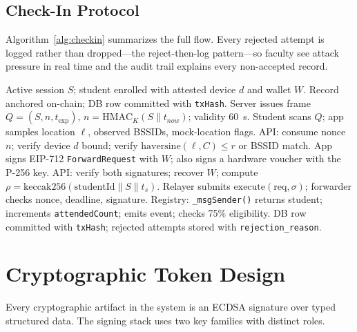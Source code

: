 \documentclass[conference]{IEEEtran}
\begin{document}
\subsection{Check-In Protocol}
Algorithm~\ref{alg:checkin} summarizes the full flow. Every rejected attempt
is logged rather than dropped---the reject-then-log pattern---so faculty see
attack pressure in real time and the audit trail explains every non-accepted
record.

\begin{algorithm}[t]
\small
\caption{Attendance check-in: issuance, proof, and anchoring.}
\label{alg:checkin}
\begin{algorithmic}[1]
\REQUIRE Active session $S$; student enrolled with attested device $d$ and wallet $W$.
\ENSURE Record anchored on-chain; DB row committed with \texttt{txHash}.
\STATE Server issues frame $Q=(S, n, t_{\mathrm{exp}})$, $n=\mathrm{HMAC}_K(S\|t_{now})$; validity 60~s.
\STATE Student scans $Q$; app samples location $\ell$, observed BSSIDs, mock-location flags.
\STATE API: consume nonce $n$; verify device $d$ bound; verify $\mathrm{haversine}(\ell, C)\leq r$ or BSSID match.
\STATE App signs EIP-712 \texttt{ForwardRequest} with $W$; also signs a hardware voucher with the P-256 key.
\STATE API: verify both signatures; recover $W$; compute $\rho=\mathrm{keccak256}(\mathrm{studentId}\|S\|t_s)$.
\STATE Relayer submits $\mathrm{execute}(\mathrm{req},\sigma)$; forwarder checks nonce, deadline, signature.
\STATE Registry: \texttt{\_msgSender()} returns student; increments \texttt{attendedCount}; emits event; checks 75\% eligibility.
\STATE DB row committed with \texttt{txHash}; rejected attempts stored with \texttt{rejection\_reason}.
\end{algorithmic}
\end{algorithm}

\section{Cryptographic Token Design}
\label{sec:token}
Every cryptographic artifact in the system is an ECDSA signature over typed
structured data. The signing stack uses two key families with distinct roles.
\end{document}
